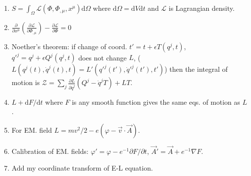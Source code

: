 \documentclass{article}
\renewcommand\d{\mathrm d}
\begin{document}
\begin{multicols}{3}
\begin{enumerate}
            \item $S=\int_\Omega\mathcal L(\Phi,\Phi_{,\mu},x^\mu)\d\Omega$ where $\d\Omega=\d V\d t$ and $\mathcal L$ is Lagrangian density.
            \item $\frac{\partial}{\partial x^\mu}\left(\frac{\partial\mathcal L}{\partial\Phi_{,\mu}}\right)-\frac{\partial\mathcal L}{\partial\Phi}=0$
            \item Noether's theorem: if change of coord. $t'=t+\epsilon T(q^j, t)$,  $q'^j=q^j+\epsilon Q^j(q^j, t)$ does not change $L$, ($L(q^j(t), \dot q^j(t), t)=L'(q'^j(t'), \dot q'^j(t'), t')$) then the integral of motion is $\mathcal Z=\sum_j\frac{\partial L}{\partial\dot q^j}(Q^j-\dot q^jT)+LT$.
            \item $L+\d F/\d t$ where $F$ is any smooth function gives the same eqs. of motion as $L$.
            \item For EM. field $L=mv^2/2-e(\varphi-\vec v\cdot\vec A)$.
            \item Calibration of EM. fields: $\varphi'=\varphi-e^{-1}\partial F/\partial t$, $\vec A'=\vec A+e^{-1}\nabla F$.
            \item {\color{red} Add my coordinate transform of E-L equation.}
        \end{enumerate}


\end{multicols}
\end{document}
